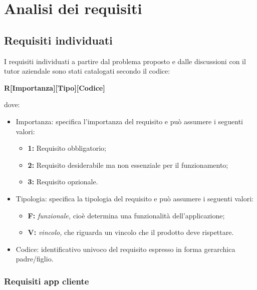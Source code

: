 
\chapter{Analisi dei requisiti}
\label{cap:analisi-requisiti}

\section{Requisiti individuati}

I requisiti individuati a partire dal problema proposto e dalle discussioni con il tutor aziendale sono stati catalogati secondo il codice:\\
\begin{center}
    \textbf{R[Importanza][Tipo][Codice]}
\end{center}
dove:
\begin{itemize}
    \item Importanza: specifica l'importanza del requisito e può assumere i seguenti valori:
    \begin{itemize}
        \item \textbf{1: } Requisito obbligatorio;
        \item \textbf{2: } Requisito desiderabile ma non essenziale per il funzionamento;
        \item \textbf{3: } Requisito opzionale.
    \end{itemize}
    \item Tipologia: specifica la tipologia del requisito e può assumere i seguenti valori:
    \begin{itemize}
        \item \textbf{F: }\textit{funzionale,} cioè determina una funzionalità dell'applicazione;
        \item \textbf{V: }\textit{vincolo,} che riguarda un vincolo che il prodotto deve rispettare.
    \end{itemize}
    \item Codice: identificativo univoco del requisito espresso in forma gerarchica padre/figlio.
\end{itemize}

\subsection{Requisiti app cliente}

